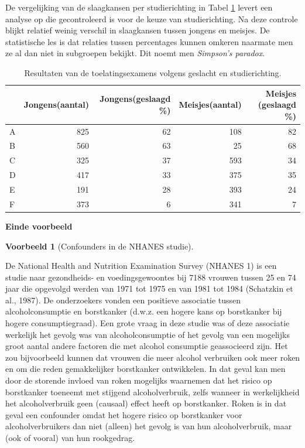 \documentclass[
  12pt,dutch,coursenotes]{book}
\theoremstyle{definition}
\theoremstyle{definition}
\newtheorem{example}{Voorbeeld}[chapter]
\theoremstyle{definition}
\theoremstyle{definition}
\theoremstyle{remark}
\begin{document}
De vergelijking van de slaagkansen per studierichting in Tabel \ref{tab:sexbias}
levert een analyse op die gecontroleerd is voor de keuze van
studierichting. Na deze controle blijkt relatief weinig verschil in
slaagkansen tussen jongens en meisjes. De statistische les is dat relaties
tussen percentages kunnen omkeren naarmate men ze al dan niet in subgroepen
bekijkt. Dit noemt men \emph{Simpson's paradox}.

\begin{table}

\caption{\label{tab:sexbias}Resultaten van de toelatingsexamens volgens geslacht en studierichting.}
\centering
\begin{tabular}[t]{lrrrr}
\toprule
  & Jongens(aantal) & Jongens(geslaagd \%) & Meisjes(aantal) & Meisjes (geslaagd \%)\\
\midrule
A & 825 & 62 & 108 & 82\\
B & 560 & 63 & 25 & 68\\
C & 325 & 37 & 593 & 34\\
D & 417 & 33 & 375 & 35\\
E & 191 & 28 & 393 & 24\\
\addlinespace
F & 373 & 6 & 341 & 7\\
\bottomrule
\end{tabular}
\end{table}

\textbf{Einde voorbeeld}

\begin{example}[Confounders in de NHANES studie]
\protect\hypertarget{exm:unnamed-chunk-83}{}{\label{exm:unnamed-chunk-83} {} }
\end{example}

De National Health and Nutrition Examination Survey
(NHANES 1) is een studie naar gezondheids- en voedingsgewoontes bij 7188
vrouwen tussen 25 en 74 jaar die opgevolgd werden van 1971 tot 1975 en van
1981 tot 1984 (Schatzkin et al., 1987). De onderzoekers vonden een positieve
associatie tussen alcoholconsumptie en borstkanker (d.w.z. een hogere kans
op borstkanker bij hogere consumptiegraad). Een grote vraag in deze studie
was of deze associatie werkelijk het gevolg was van alcoholconsumptie of het
gevolg van een mogelijks groot aantal andere factoren die met alcohol
consumptie geassocieerd zijn. Het zou bijvoorbeeld kunnen dat vrouwen die
meer alcohol verbruiken ook meer roken en om die reden gemakkelijker
borstkanker ontwikkelen. In dat geval kan men door de storende invloed van
roken mogelijks waarnemen dat het risico op borstkanker toeneemt met
stijgend alcoholverbruik, zelfs wanneer in werkelijkheid het alcoholverbruik
geen (causaal) effect heeft op borstkanker. Roken is in dat geval een
confounder omdat het hogere risico op borstkanker voor alcoholverbruikers
dan niet (alleen) het gevolg is van hun alcoholverbruik, maar (ook of
vooral) van hun rookgedrag.
\end{document}
